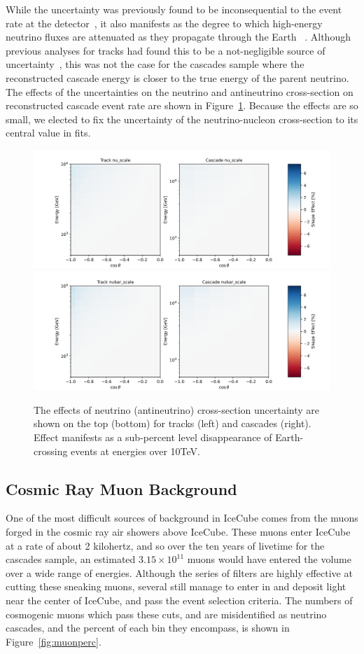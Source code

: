 \documentclass[main.tex]{subfiles}
\begin{document}
While the uncertainty was previously found to be inconsequential to the event rate at the detector~\cite{osti_1221354, 2015PhDT94D}, it also manifests as the degree to which high-energy neutrino fluxes are attenuated as they propagate through the Earth ~\cite{Vincent:2017svp, PhysRevD.83.113009, Cooper_Sarkar_2011}. 
Although previous analyses for tracks had found this to be a not-negligible source of uncertainty~\cite{Aartsen_2020, Aartsen_2020_prd}, this was not the case for the cascades sample where the reconstructed cascade energy is closer to the true energy of the parent neutrino.
The effects of the uncertainties on the neutrino and antineutrino cross-section on reconstructed cascade event rate are shown in Figure~\ref{fig:nucross}.
Because the effects are so small, we elected to fix the uncertainty of the neutrino-nucleon cross-section to its central value in fits. 

\begin{figure}
    \centering
    \includegraphics[width=0.7\linewidth]{figures/systematics/nu_scale.png} \\
    \includegraphics[width=0.7\linewidth]{figures/systematics/nubar_scale.png}
    \caption{The effects of neutrino (antineutrino) cross-section uncertainty are shown on the top (bottom) for tracks (left) and cascades (right). Effect manifests as a sub-percent level disappearance of Earth-crossing events at energies over 10TeV.}\label{fig:nucross}
\end{figure}


\subsection{Cosmic Ray Muon Background}

One of the most difficult sources of background in IceCube comes from the muons forged in the cosmic ray air showers above IceCube. 
These muons enter IceCube at a rate of about 2 kilohertz, and so over the ten years of livetime for the cascades sample, an estimated $3.15\times 10^{11}$ muons would have entered the volume over a wide range of energies. 
Although the series of filters are highly effective at cutting these sneaking muons, several still manage to enter in and deposit light near the center of IceCube, and pass the event selection criteria. 
The numbers of cosmogenic muons which pass these cuts, and are misidentified as neutrino cascades, and the percent of each bin they encompass, is shown in Figure~\ref{fig:muonperc}.
\end{document}
